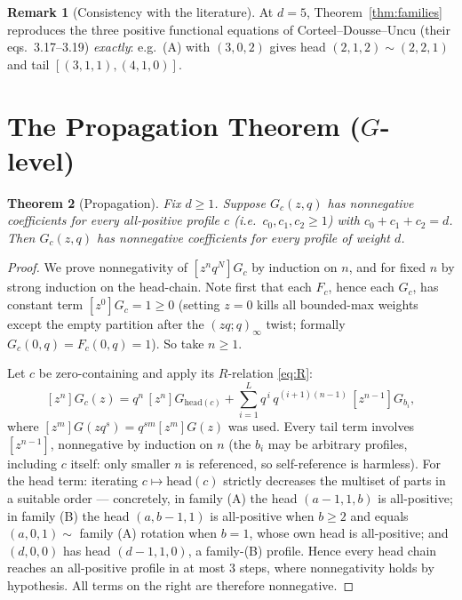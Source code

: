 \documentclass[11pt]{article}
\newtheorem{theorem}{Theorem}
\theoremstyle{definition}
\newtheorem{remark}[theorem]{Remark}
\begin{document}
\begin{remark}[Consistency with the literature]
At $d=5$, Theorem~\ref{thm:families} reproduces the three positive functional equations
of Corteel--Dousse--Uncu (their eqs.\ 3.17--3.19) \emph{exactly}: e.g.\ (A) with
$(3,0,2)$ gives head $(2,1,2)\sim(2,2,1)$ and tail $[(3,1,1),(4,1,0)]$.
\end{remark}

\section{The Propagation Theorem ($G$-level)}

\begin{theorem}[Propagation]\label{thm:prop}
Fix $d\ge 1$. Suppose $G_c(z,q)$ has nonnegative coefficients for every all-positive
profile $c$ (i.e.\ $c_0,c_1,c_2\ge 1$) with $c_0+c_1+c_2=d$. Then $G_c(z,q)$ has
nonnegative coefficients for \emph{every} profile of weight $d$.
\end{theorem}

\begin{proof}
We prove nonnegativity of $[z^nq^N]G_c$ by induction on $n$, and for fixed $n$ by
strong induction on the head-chain. Note first that each $F_c$, hence each $G_c$,
has constant term $[z^0]G_c=1\ge 0$ (setting $z=0$ kills all bounded-max weights
except the empty partition after the $(zq;q)_\infty$ twist; formally
$G_c(0,q)=F_c(0,q)=1$). So take $n\ge 1$.

Let $c$ be zero-containing and apply its $R$-relation \eqref{eq:R}:
\[
[z^n]G_c(z) = q^{n}\,[z^n]G_{\mathrm{head}(c)}
+ \sum_{i=1}^{L} q^{\,i}\,q^{(i+1)(n-1)}\,[z^{n-1}]G_{b_i},
\]
where $[z^m]G(zq^s)=q^{sm}[z^m]G(z)$ was used. Every tail term involves $[z^{n-1}]$,
nonnegative by induction on $n$ (the $b_i$ may be arbitrary profiles, including $c$
itself: only smaller $n$ is referenced, so self-reference is harmless). For the head
term: iterating $c\mapsto\mathrm{head}(c)$ strictly decreases the multiset of parts
in a suitable order --- concretely, in family (A) the head $(a{-}1,1,b)$ is
all-positive; in family (B) the head $(a,b{-}1,1)$ is all-positive when $b\ge 2$ and
equals $(a,0,1)\sim$ family (A) rotation when $b=1$, whose own head is all-positive;
and $(d,0,0)$ has head $(d{-}1,1,0)$, a family-(B) profile. Hence every head chain
reaches an all-positive profile in at most $3$ steps, where nonnegativity holds by
hypothesis. All terms on the right are therefore nonnegative.
\end{proof}
\end{document}
